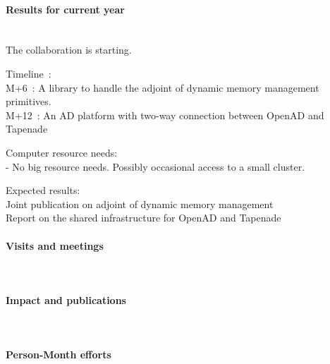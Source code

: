 \begin{refsection}
\paragraph{Results for current year}~\\

The collaboration is starting.

Timeline :\\
M+6 : A library to handle the adjoint of dynamic memory management primitives.\\
M+12 : An AD platform with two-way connection between OpenAD and Tapenade 

Computer resource needs:\\
   - No big resource needs. Possibly occasional access to a small cluster.

Expected results:\\
Joint publication on adjoint of dynamic memory management\\
Report on the shared infrastructure for OpenAD and Tapenade



\paragraph{Visits and meetings}~\\

\paragraph{Impact and publications}~\\

\printbibliography[heading=none,keyword=own]



\paragraph{Person-Month efforts}~\\


\end{refsection}
